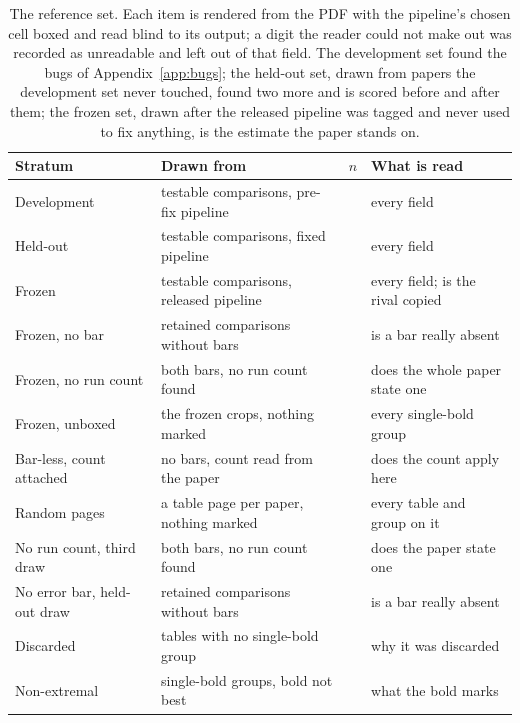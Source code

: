 \documentclass{article}
\begin{document}
\begin{table}[h]
\centering
\small
\caption{The reference set. Each item is rendered from the PDF with the pipeline's
chosen cell boxed and read blind to its output; a digit the reader could not
make out was recorded as unreadable and left out of that field. The
development set found the bugs of Appendix~\ref{app:bugs}; the held-out set,
drawn from papers the development set never touched, found two more and is
scored before and after them; the frozen set, drawn after the released
pipeline was tagged and never used to fix anything, is the estimate the paper
stands on.}
\label{tab:gold}
\setlength{\tabcolsep}{4pt}
\begin{tabular}{llrl}
\toprule
Stratum & Drawn from & $n$ & What is read \\
\midrule
Development & testable comparisons, pre-fix pipeline & \nGoldDevN{} & every field \\
Held-out & testable comparisons, fixed pipeline & \nGoldHeldN{} & every field \\
Frozen & testable comparisons, released pipeline & \nGoldFrozenN{} & every field; is the rival copied \\
Frozen, no bar & retained comparisons without bars & \nGoldFrozenNoBarN{} & is a bar really absent \\
Frozen, no run count & both bars, no run count found & \nGoldFrozenNoNN{} & does the whole paper state one \\
Frozen, unboxed & the frozen crops, nothing marked & \nNoboxN{} & every single-bold group \\
Bar-less, count attached & no bars, count read from the paper & \nNobarNN{} & does the count apply here \\
Random pages & a table page per paper, nothing marked & \nPagesN{} & every table and group on it \\
No run count, third draw & both bars, no run count found & \nGoldNoNN{} & does the paper state one \\
No error bar, held-out draw & retained comparisons without bars & \nGoldNoBarN{} & is a bar really absent \\
Discarded & tables with no single-bold group & \nGoldDiscardedN{} & why it was discarded \\
Non-extremal & single-bold groups, bold not best & \nGoldNonExtN{} & what the bold marks \\
\bottomrule
\end{tabular}
\end{table}
\end{document}
